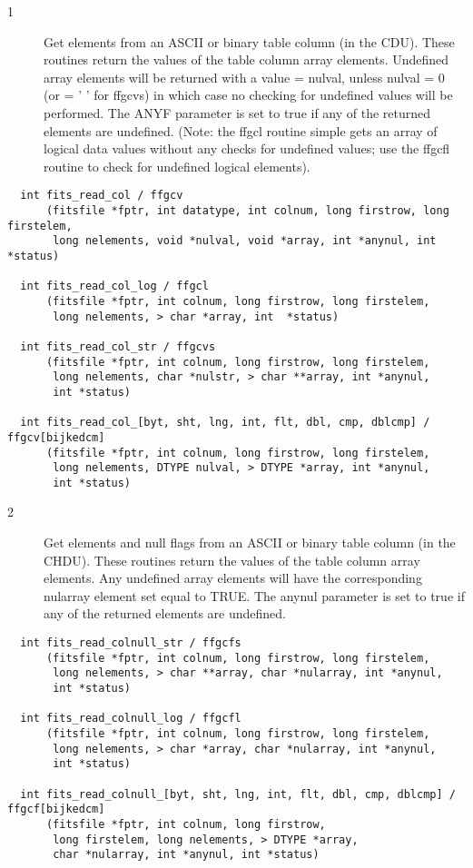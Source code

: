 \begin{description}
\item[1 ] Get elements from an ASCII or binary table column (in the CDU).  These
    routines return the values of the table column array elements.  Undefined
    array elements will be returned with a value = nulval, unless nulval = 0
    (or = ' ' for ffgcvs) in which case no checking for undefined values will
    be performed. The ANYF parameter is set to true if any of the returned
    elements are undefined. (Note: the ffgcl routine simple gets an array
    of logical data values without any checks for undefined values;  use
   the ffgcfl routine to check for undefined logical elements).
\end{description}

\begin{verbatim}
  int fits_read_col / ffgcv
      (fitsfile *fptr, int datatype, int colnum, long firstrow, long firstelem,
       long nelements, void *nulval, void *array, int *anynul, int *status)

  int fits_read_col_log / ffgcl
      (fitsfile *fptr, int colnum, long firstrow, long firstelem,
       long nelements, > char *array, int  *status)

  int fits_read_col_str / ffgcvs
      (fitsfile *fptr, int colnum, long firstrow, long firstelem,
       long nelements, char *nulstr, > char **array, int *anynul,
       int *status)

  int fits_read_col_[byt, sht, lng, int, flt, dbl, cmp, dblcmp] / ffgcv[bijkedcm]
      (fitsfile *fptr, int colnum, long firstrow, long firstelem,
       long nelements, DTYPE nulval, > DTYPE *array, int *anynul,
       int *status)
\end{verbatim}

\begin{description}
\item[2 ]  Get elements and null flags from an ASCII or binary table column (in the
    CHDU).  These routines return the values of the table column array elements.
    Any undefined array elements will have the corresponding nularray element
    set equal to TRUE.  The anynul parameter is set to true if any of the
   returned elements are undefined.
\end{description}

\begin{verbatim}
  int fits_read_colnull_str / ffgcfs
      (fitsfile *fptr, int colnum, long firstrow, long firstelem,
       long nelements, > char **array, char *nularray, int *anynul,
       int *status)

  int fits_read_colnull_log / ffgcfl
      (fitsfile *fptr, int colnum, long firstrow, long firstelem,
       long nelements, > char *array, char *nularray, int *anynul,
       int *status)

  int fits_read_colnull_[byt, sht, lng, int, flt, dbl, cmp, dblcmp] / ffgcf[bijkedcm]
      (fitsfile *fptr, int colnum, long firstrow,
       long firstelem, long nelements, > DTYPE *array,
       char *nularray, int *anynul, int *status)
\end{verbatim}

